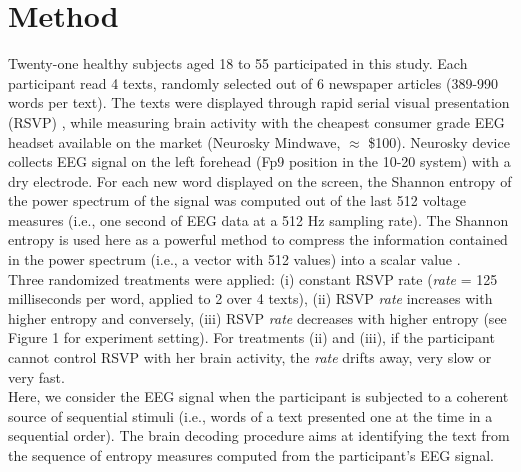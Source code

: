 \section{Method}

Twenty-one healthy subjects aged 18 to 55 participated in this study. Each participant read 4 texts, randomly selected out of 6 newspaper articles (389-990 words per text). The texts were displayed through rapid serial visual presentation (RSVP) \cite{potter1984rapid,potter1975time}, while measuring brain activity with the cheapest consumer grade EEG headset available on the market (Neurosky Mindwave,  $\approx$ \$100). Neurosky device collects EEG signal on the left forehead (Fp9 position in the 10-20 system) with a dry electrode. For each new word displayed on the screen, the Shannon entropy of the power spectrum of the signal \cite{Tellenbach2009Beyond} was computed out of the last 512 voltage measures (i.e., one second of EEG data at a 512 Hz sampling rate). The Shannon entropy is used here as a powerful method to compress the information contained in the power spectrum (i.e., a vector with 512 values) into a scalar value \cite{ornstein1993entropy}.  \\

Three randomized treatments were applied:  (i) constant RSVP rate ({\it rate} = 125 milliseconds per word, applied to 2 over 4 texts), (ii) RSVP {\it rate}  increases with higher entropy and conversely, (iii) RSVP {\it rate}  decreases with higher entropy (see Figure 1 for experiment setting). For treatments (ii) and (iii), if the participant cannot control RSVP with her brain activity, the {\it rate} drifts away, very slow or very fast.\\

Here, we consider the EEG signal when the participant is subjected to a coherent source of sequential stimuli (i.e., words of a text presented one at the time in a sequential order). The brain decoding procedure aims at identifying the text from the sequence of entropy measures computed from the participant's EEG signal.\\
